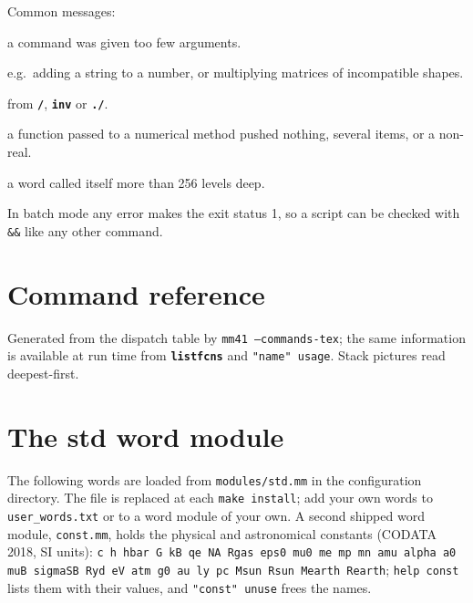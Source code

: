 \documentclass[11pt,letterpaper]{article}
\newcommand{\code}[1]{\texttt{#1}}
\newcommand{\cmd}[1]{\texttt{\textbf{#1}}}
\begin{document}
Common messages:
\begin{description}[leftmargin=1.5em]
  \item[\code{needs N item(s) on the stack}] a command was given too few arguments.
  \item[\code{unsupported operand types}] e.g.\ adding a string to a number, or multiplying matrices of incompatible shapes.
  \item[\code{Division by zero}] from \cmd{/}, \cmd{inv} or \cmd{./}.
  \item[\code{must leave exactly one real result}] a function passed to a numerical method pushed nothing, several items, or a non-real.
  \item[\code{runaway recursion}] a word called itself more than 256 levels deep.
\end{description}
In batch mode any error makes the exit status 1, so a script can be checked with \code{\&\&} like any other command.

\appendix
\clearpage
\section{Command reference}
\label{app:commands}

Generated from the dispatch table by \code{mm41 --commands-tex}; the same information is available at run time from \cmd{listfcns} and \code{"name" usage}. Stack pictures read deepest-first.

\small

\normalsize

\clearpage
\section{The std word module}
\label{app:macros}

The following words are loaded from \code{modules/std.mm} in the configuration directory. The file is replaced at each \code{make install}; add your own words to \code{user\_words.txt} or to a word module of your own. A second shipped word module, \code{const.mm}, holds the physical and astronomical constants (CODATA 2018, SI units): \code{c h hbar G kB qe NA Rgas eps0 mu0 me mp mn amu alpha a0 muB sigmaSB Ryd eV atm g0 au ly pc Msun Rsun Mearth Rearth}; \code{help const} lists them with their values, and \code{"const" unuse} frees the names.
\end{document}

